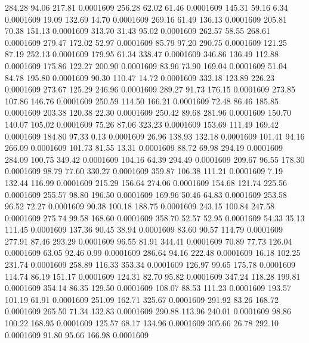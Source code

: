  284.28   94.06  217.81   0.0001609
 256.28   62.02   61.46   0.0001609
 145.31   59.16    6.34   0.0001609
  19.09  132.69   14.70   0.0001609
 269.16   61.49  136.13   0.0001609
 205.81   70.38  151.13   0.0001609
 313.70   31.43   95.02   0.0001609
 262.57   58.55  268.61   0.0001609
 279.47  172.02   52.97   0.0001609
  85.79   97.20  290.75   0.0001609
 121.25   87.19  252.13   0.0001609
 179.95   61.34  338.47   0.0001609
 346.86  136.49  112.88   0.0001609
 175.86  122.27  200.90   0.0001609
  83.96   73.90  169.04   0.0001609
  51.04   84.78  195.80   0.0001609
  90.30  110.47   14.72   0.0001609
 332.18  123.89  226.23   0.0001609
 273.67  125.29  246.96   0.0001609
 289.27   91.73  176.15   0.0001609
 273.85  107.86  146.76   0.0001609
 250.59  114.50  166.21   0.0001609
  72.48   86.46  185.85   0.0001609
 203.38  120.38   22.30   0.0001609
 250.42   89.68  281.96   0.0001609
 150.70  140.07  105.02   0.0001609
  75.26   87.06  323.23   0.0001609
 153.69  111.49  169.42   0.0001609
 184.80   97.33    0.13   0.0001609
  26.96  138.93  132.18   0.0001609
 101.41   94.16  266.09   0.0001609
 101.73   81.55   13.31   0.0001609
  88.72   69.98  294.19   0.0001609
 284.09  100.75  349.42   0.0001609
 104.16   64.39  294.49   0.0001609
 209.67   96.55  178.30   0.0001609
  98.79   77.60  330.27   0.0001609
 359.87  106.38  111.21   0.0001609
   7.19  132.44  116.99   0.0001609
 215.29  156.64  274.06   0.0001609
 154.68  121.74  225.56   0.0001609
 255.57   98.80  196.50   0.0001609
 169.96   50.46   64.83   0.0001609
 253.58   96.52   72.27   0.0001609
  90.38  100.18  188.75   0.0001609
 243.15  100.84  247.58   0.0001609
 275.74   99.58  168.60   0.0001609
 358.70   52.57   52.95   0.0001609
  54.33   35.13  111.45   0.0001609
 137.36   90.45   38.94   0.0001609
  83.60   90.57  114.79   0.0001609
 277.91   87.46  293.29   0.0001609
  96.55   81.91  344.41   0.0001609
  70.89   77.73  126.04   0.0001609
  63.05   92.46    0.99   0.0001609
 286.64   94.16  222.48   0.0001609
  16.18  102.25  231.74   0.0001609
 258.89  116.33  353.34   0.0001609
 126.97   99.65  175.78   0.0001609
 114.74   86.19  151.17   0.0001609
 124.31   82.70   95.82   0.0001609
 347.24  118.28  199.81   0.0001609
 354.14   86.35  129.50   0.0001609
 108.07   88.53  111.23   0.0001609
 193.57  101.19   61.91   0.0001609
 251.09  162.71  325.67   0.0001609
 291.92   83.26  168.72   0.0001609
 265.50   71.34  132.83   0.0001609
 290.88  113.96  240.01   0.0001609
  98.86  100.22  168.95   0.0001609
 125.57   68.17  134.96   0.0001609
 305.66   26.78  292.10   0.0001609
  91.80   95.66  166.98   0.0001609
